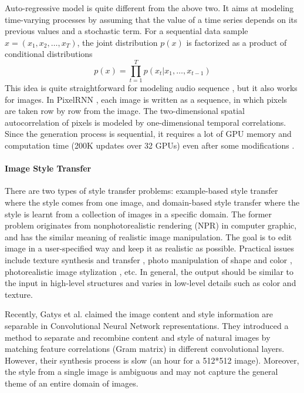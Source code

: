 \documentclass{article}
\begin{document}
Auto-regressive model is quite different from the above two. It aims at modeling time-varying processes by assuming that the value of a time series depends on its previous values and a stochastic term. For a sequential data sample $x = (x_1, x_2, \ldots, x_T)$, the joint distribution $p(x)$ is factorized as a product of conditional distributions
\begin{equation}
p(x) = \prod_{t=1}^{T} p(x_t|x_1, \ldots, x_{t-1})
\end{equation}
This idea is quite straightforward for modeling audio sequence \cite{van2016wavenet}, but it also works for images. In PixelRNN \cite{VanDenOord:2016:PRN:3045390.3045575}, each image is written as a sequence, in which pixels are taken row by row from the image. The two-dimensional spatial autocorrelation of pixels is modeled by one-dimensional temporal correlations. Since the generation process is sequential, it requires a lot of GPU memory and computation time (200K updates over 32 GPUs) even after some modifications \cite{NIPS2016_6527}.


\paragraph{Image Style Transfer} %
There are two types of style transfer problems: example-based style transfer where the style comes from one image, and domain-based style transfer where the style is learnt from a collection of images in a specific domain. The former problem originates from nonphotorealistic rendering (NPR) \cite{6243138} in computer graphic, and has the similar meaning of realistic image manipulation. The goal is to edit image in a user-specified way and keep it as realistic as possible. Practical issues include texture synthesis and transfer \cite{7874180}, photo manipulation of shape and color \cite{10.1007/978-3-319-46454-1_36}, photorealistic image stylization \cite{Li_2018_ECCV}, etc. In general, the output should be similar to the input in high-level structures and varies in low-level details such as color and texture.

Recently, Gatys et al. \cite{gatys2016image} claimed the image content and style information are separable in Convolutional Neural Network representations. They introduced a method \cite{DBLP:journals/corr/GatysEB15a} to separate and recombine content and style of natural images by matching feature correlations (Gram matrix) in different convolutional layers. However, their synthesis process is slow (an hour for a 512*512 image). Moreover, the style from a single image is ambiguous and may not capture the general theme of an entire domain of images.
\end{document}
